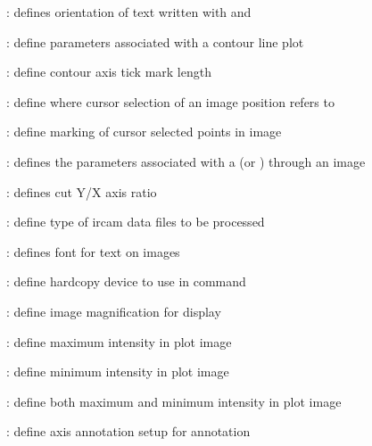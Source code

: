 \begin{description}
\item []: defines orientation of text
written with {\bf {}} and {\bf {}}

\item []: define parameters associated with a
contour line plot

\item []: define contour axis tick mark
length

\item []: define where cursor selection of an
image position refers to

\item []: define marking of cursor
selected points in image

\item []: defines the parameters associated
with a {\bf {}} (or {\bf {}}) through
an image

\item []: defines cut Y/X axis ratio

\item []: define type of {\sc ircam} data
files to be processed

\item []: defines font for text on images

\item []: define hardcopy device to use in
{\bf {}} command

\item []: define image magnification for display

\item []: define maximum intensity in plot image

\item []: define minimum intensity in plot image

\item []: define both maximum and minimum
intensity in plot image

\item []: define axis annotation setup for
{\bf {}} annotation


\end{description}
